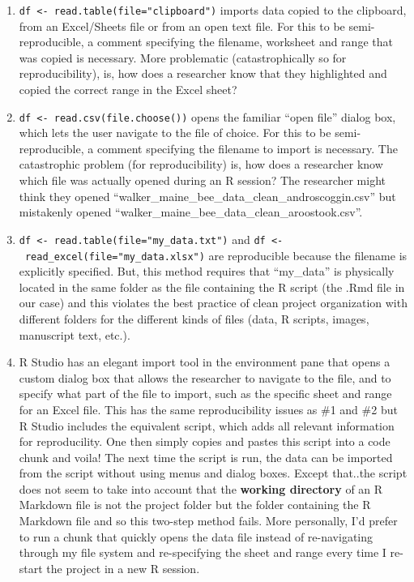 \documentclass[]{book}
\providecommand{\tightlist}{%
  \setlength{\itemsep}{0pt}\setlength{\parskip}{0pt}}
\begin{document}
\begin{enumerate}
\def\labelenumi{\arabic{enumi}.}
\tightlist
\item
  \texttt{df\ \textless{}-\ read.table(file="clipboard")} imports data copied to the clipboard, from an Excel/Sheets file or from an open text file. For this to be semi-reproducible, a comment specifying the filename, worksheet and range that was copied is necessary. More problematic (catastrophically so for reproducibility), is, how does a researcher know that they highlighted and copied the correct range in the Excel sheet?
\item
  \texttt{df\ \textless{}-\ read.csv(file.choose())} opens the familiar ``open file'' dialog box, which lets the user navigate to the file of choice. For this to be semi-reproducible, a comment specifying the filename to import is necessary. The catastrophic problem (for reproducibility) is, how does a researcher know which file was actually opened during an R session? The researcher might think they opened ``walker\_maine\_bee\_data\_clean\_androscoggin.csv'' but mistakenly opened ``walker\_maine\_bee\_data\_clean\_aroostook.csv''.
\item
  \texttt{df\ \textless{}-\ read.table(file="my\_data.txt")} and \texttt{df\ \textless{}-\ read\_excel(file="my\_data.xlsx")} are reproducible because the filename is explicitly specified. But, this method requires that ``my\_data'' is physically located in the same folder as the file containing the R script (the .Rmd file in our case) and this violates the best practice of clean project organization with different folders for the different kinds of files (data, R scripts, images, manuscript text, etc.).
\item
  R Studio has an elegant import tool in the environment pane that opens a custom dialog box that allows the researcher to navigate to the file, and to specify what part of the file to import, such as the specific sheet and range for an Excel file. This has the same reproducibility issues as \#1 and \#2 but R Studio includes the equivalent script, which adds all relevant information for reproducility. One then simply copies and pastes this script into a code chunk and voila! The next time the script is run, the data can be imported from the script without using menus and dialog boxes. Except that..the script does not seem to take into account that the \textbf{working directory} of an R Markdown file is not the project folder but the folder containing the R Markdown file and so this two-step method fails. More personally, I'd prefer to run a chunk that quickly opens the data file instead of re-navigating through my file system and re-specifying the sheet and range every time I re-start the project in a new R session.
\end{enumerate}
\end{document}
